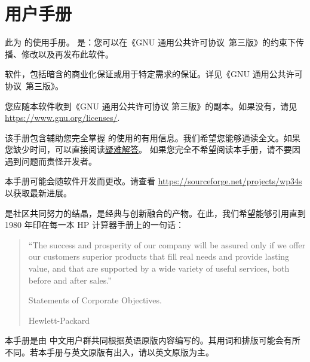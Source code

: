 
\chapter{\wpx 用户手册}

此为 \wpx 的使用手册。 \wpx 是：您可以在《GNU 通用公共许可协议~第三版》的约束下传播、修改以及再发布此软件。

\wpx 软件，包括暗含的商业化保证或用于特定需求的保证。详见《GNU 通用公共许可协议~第三版》。

您应随本软件收到《GNU 通用公共许可协议 第三版》的副本。如果没有，请见\url{https://www.gnu.org/licenses/}.

该手册包含辅助您完全掌握 \wpx 的使用的有用信息。我们希望您能够通读全文。如果您缺少时间，可以直接阅读\hyperref[chapter:troubleshooting]{疑难解答}。
如果您完全不希望阅读本手册，请不要因遇到问题而责怪开发者。

本手册可能会随软件开发而更改。请查看 \url{https://sourceforge.net/projects/wp34s} 以获取最新进展。

\wpx 是社区共同努力的结晶，是经典与创新融合的产物。在此，我们希望能够引用直到 1980 年印在每一本 HP 计算器手册上的一句话：

\begin{quote}
``The success and prosperity of our company will be assured only if we offer our 
customers superior products that fill real needs and provide lasting value, and 
that are supported by a wide variety of useful services, both before and after 
sales.''

\begin{flushright}
Statements of Corporate Objectives.

Hewlett-Packard
\end{flushright}
\end{quote}

本手册是由 \wpx 中文用户群共同根据英语原版内容编写的。其用词和排版可能会有所不同。若本手册与英文原版有出入，请以英文原版为主。